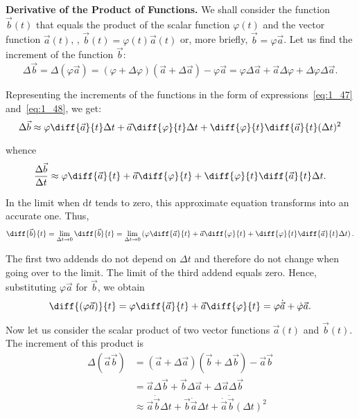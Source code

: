 \textbf{Derivative of the Product of Functions.} We shall consider the function $\vec{b}(t)$ that equals the product of the scalar function $\varphi(t)$ and the vector function $\vec{a}(t)$, \ie, $\vec{b}(t)=\varphi(t)\vec{a}(t)$ or, more briefly, $\vec{b}=\varphi\vec{a}$. Let us find the increment of the function $\vec{b}$:
\begin{equation*}
\Delta\vec{b} = \Delta(\varphi\vec{a}) = (\varphi + \Delta\varphi)(\vec{a} + \Delta\vec{a}) - \varphi\vec{a} = \varphi\Delta\vec{a} + \vec{a}\Delta\varphi + \Delta\varphi\Delta\vec{a}.
\end{equation*}

\noindent
Representing the increments of the functions in the form of expressions~\eqref{eq:1_47} and~\eqref{eq:1_48}, we get:
\begin{equation*}
\Delta\vec{b} \approx \varphi\diff{\vec{a}}{t}\Delta t + \vec{a}\diff{\varphi}{t}\Delta t + \diff{\varphi}{t}\diff{\vec{a}}{t}(\Delta t)^2
\end{equation*}

\noindent
whence
\begin{equation*}
\frac{\Delta\vec{b}}{\Delta t} \approx \varphi\diff{\vec{a}}{t} + \vec{a}\diff{\varphi}{t} + \diff{\varphi}{t}\diff{\vec{a}}{t}\Delta t.
\end{equation*}

\noindent
In the limit when $\mathrm{d}t$ tends to zero, this approximate equation transforms into an accurate one. Thus,
\begin{equation*}
\diff{\vec{b}}{t} = \lim_{\Delta t\to 0} \diff{\vec{b}}{t} =  \lim_{\Delta t\to 0} \left(\varphi\diff{\vec{a}}{t} + \vec{a}\diff{\varphi}{t} + \diff{\varphi}{t} \diff{\vec{a}}{t}\Delta t\right).
\end{equation*}

\noindent
The first two addends do not depend on $\Delta t$ and therefore do not change when going over to the limit. The limit of the third addend equals zero. Hence, substituting $\varphi\vec{a}$ for $\vec{b}$, we obtain
\begin{equation}\label{eq:1_49}
\diff{(\varphi\vec{a})}{t} = \varphi\diff{\vec{a}}{t} + \vec{a}\diff{\varphi}{t} = \varphi\dot{\vec{a}}+\dot{\varphi}\vec{a}.
\end{equation}

Now let us consider the scalar product of two vector functions $\vec{a}(t)$ and $\vec{b}(t)$. The increment of this product is
\begin{align*}
\Delta(\vec{a}\vec{b}) &= (\vec{a} + \Delta\vec{a})(\vec{b} + \Delta\vec{b}) - \vec{a}\vec{b}\\
&= \vec{a}\Delta\vec{b} + \vec{b}\Delta\vec{a} + \Delta\vec{a}\Delta\vec{b} \\
&\approx \vec{a}\dot{\vec{b}}\Delta t + \vec{b}\dot{\vec{a}}\Delta t + \dot{\vec{a}}\dot{\vec{b}}(\Delta t)^2
\end{align*}

